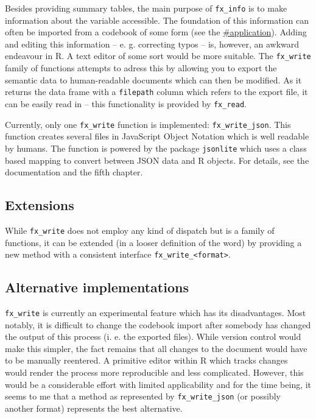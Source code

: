 \documentclass[]{report}
\theoremstyle{definition}
\theoremstyle{definition}
\theoremstyle{definition}
\theoremstyle{remark}
\begin{document}
Besides providing summary tables, the main purpose of \texttt{fx\_info}
is to make information about the variable accessible. The foundation of
this information can often be imported from a codebook of some form (see
the \href{application}{\#application}). Adding and editing this
information -- e. g. correcting typos -- is, however, an awkward
endeavour in R. A text editor of some sort would be more suitable. The
\texttt{fx\_write} family of functions attempts to adress this by
allowing you to export the semantic data to human-readable documents
which can then be modified. As it returns the data frame with a
\texttt{filepath} column which refers to the export file, it can be
easily read in -- this functionality is provided by \texttt{fx\_read}.

Currently, only one \texttt{fx\_write} function is implemented:
\texttt{fx\_write\_json}. This function creates several files in
JavaScript Object Notation which is well readable by humans. The
function is powered by the package \texttt{jsonlite} \citep{jsonlite}
which uses a class based mapping to convert between JSON data and R
objects. For details, see the documentation and the fifth chapter.

\subsection{Extensions}\label{extensions-3}

While \texttt{fx\_write} does not employ any kind of dispatch but is a
family of functions, it can be extended (in a looser definition of the
word) by providing a new method with a consistent interface
\texttt{fx\_write\_\textless{}format\textgreater{}}.

\subsection{Alternative
implementations}\label{alternative-implementations-1}

\texttt{fx\_write} is currently an experimental feature which has its
disadvantages. Most notably, it is difficult to change the codebook
import after somebody has changed the output of this process (i. e. the
exported files). While version control would make this simpler, the fact
remains that all changes to the document would have to be manually
reentered. A primitive editor within R which tracks changes would render
the process more reproducible and less complicated. However, this would
be a considerable effort with limited applicability and for the time
being, it seems to me that a method as represented by
\texttt{fx\_write\_json} (or possibly another format) represents the
best alternative.
\end{document}
